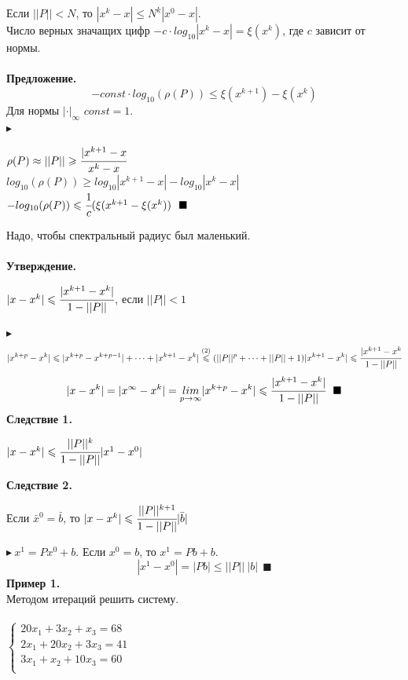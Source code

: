 \documentclass[12pt]{article}
\theoremstyle{definition}
\numberwithin{equation}{section}
\begin{document}
	Если $||P||<N$, то $|x^k-x|\leqslant N^k|x^0-x|$.\\
	Число верных значащих цифр $-c\cdot log_{10}|x^k-x|=\xi(x^k)$, где $c$ зависит от нормы.\\ \\
	\textbf{Предложение.} 
	$$-const\cdot log_{10}(\rho(P))\leqslant \xi(x^{k+1})-\xi(x^k)$$
	Для нормы $|\cdot|_{\infty}$ $const=1$.\\
	$\blacktriangleright$\begin{center}
		$\rho(P) \approx ||P|| \geqslant \cfrac{|x^{k+1}-x}{x^k-x}$\\
		$log_{10}(\rho(P))\geqslant log_{10}|x^{k+1}-x|-log_{10}|x^k-x|$\\
		$-log_{10}(\rho(P))\leqslant\cfrac{1}{c}(\xi(x^{k+1}-\xi(x^k))~~\blacksquare$
	\end{center}
	Надо, чтобы спектральный радиус был маленький.\\ \\
	\textbf{Утверждение.} 
	\begin{center}
		$|x-x^k|\leqslant \cfrac{|x^{k+1}-x^k|}{1-||P||}$, если $||P||<1$
	\end{center}
	$\blacktriangleright$ $$|x^{k+p}-x^k|\leqslant|x^{k+p}-x^{k+p-1}|+\cdots+|x^{k+1}-x^k|\overset{(2)}{\leqslant}(||P||^p+\cdots+||P||+1)|x^{k+1}-x^k|\leqslant\cfrac{|x^{k+1}-x^k}{1-||P||}$$
	$$|x-x^k|=|x^{\infty}-x^k|=\underset{p\to \infty}{lim}|x^{k+p}-x^k|\leqslant\cfrac{|x^{k+1}-x^k|}{1-||P||}~~\blacksquare$$
	\textbf{Следствие 1.}
	\begin{center}
		$|x-x^k|\leqslant \cfrac{||P||^k}{1-||P||}|x^1-x^0|$
	\end{center}
	\textbf{Следствие 2.}
	\begin{center}
		Если $\bar x^0=\bar b$, то $|x-x^k|\leqslant \cfrac{||P||^{k+1}}{1-||P||}|\bar b|$
	\end{center}
	$\blacktriangleright~x^1=Px^0+b$. Если $x^0=b$, то $x^1=Pb+b$.\\
	$$|x^1-x^0|=|Pb|\leqslant||P||~|b|~~\blacksquare$$
	\textbf{Пример 1.}\\
	Методом итераций решить систему.\\ \\
	$
	\left\{
	\begin{array}{lcl}
	20x_1+3x_2+x_3=68\\
	2x_1+20x_2+3x_3=41\\
	3x_1+x_2+10x_3=60\\
	\end{array}
	\right.
	$
	\\
\end{document}
